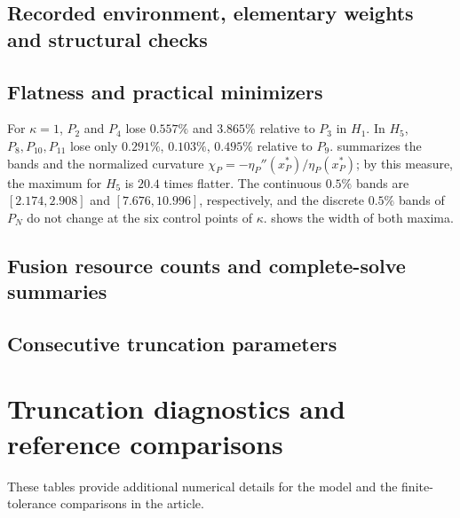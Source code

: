 \documentclass[11pt]{article}
\begin{document}
\subsection{Recorded environment, elementary weights and structural checks}



\FloatBarrier

\subsection{Flatness and practical minimizers}

For $\kappa=1$, $P_2$ and $P_4$ lose $0.557\%$ and $3.865\%$ relative to $P_3$ in $H_1$. In $H_5$, $P_8,P_{10},P_{11}$ lose only $0.291\%$, $0.103\%$, $0.495\%$ relative to $P_9$.  summarizes the bands and the normalized curvature $\chi_P=-\eta_P''(x_P^*)/\eta_P(x_P^*)$; by this measure, the maximum for $H_5$ is $20.4$ times flatter. The continuous $0.5\%$ bands are $[2.174,2.908]$ and $[7.676,10.996]$, respectively, and the discrete $0.5\%$ bands of $P_N$ do not change at the six control points of $\kappa$.  shows the width of both maxima.








\FloatBarrier

\subsection{Fusion resource counts and complete-solve summaries}



\FloatBarrier

\clearpage
\subsection{Consecutive truncation parameters}

\FloatBarrier

\clearpage
\section{Truncation diagnostics and reference comparisons}\label{sec:reference-diagnostics}
These tables provide additional numerical details for the model and the finite-tolerance comparisons in the article.
\end{document}
